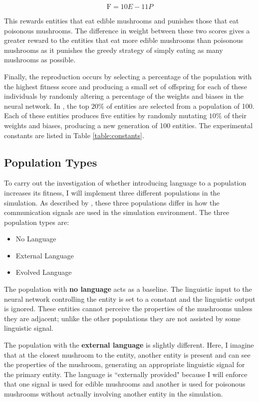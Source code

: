 \documentclass[12pt,a4paper,twoside,openright]{report}
\begin{document}
\begin{equation}
\label{equation:fitness}
\mathrm{F} = 10 E- 11 P
\end{equation}

This rewards entities that eat edible mushrooms and punishes those that eat poisonous mushrooms. The difference in weight between these two scores gives a greater reward to the entities that eat more edible mushrooms than poisonous mushrooms as it punishes the greedy strategy of simply eating as many mushrooms as possible.

Finally, the reproduction occurs by selecting a percentage of the population with the highest fitness score and producing a small set of offspring for each of these individuals by randomly altering a percentage of the weights and biases in the neural network. In \cite{Cangelosi1998}, the top $20\%$ of entities are selected from a population of 100. Each of these entities produces five entities by randomly mutating $10\%$ of their weights and biases, producing a new generation of 100 entities. The experimental constants are listed in Table \ref{table:constants}.

\subsection{Population Types}\label{section:populations}

To carry out the investigation of whether introducing language to a population increases its fitness, I will implement three different populations in the simulation. As described by \cite{Cangelosi1998}, these three populations differ in how the communication signals are used in the simulation environment. The three population types are:

\begin{itemize}
	\item No Language
	\item External Language
	\item Evolved Language
\end{itemize}

The population with {\bf no language} acts as a baseline. The linguistic input to the neural network controlling the entity is set to a constant and the linguistic output is ignored. These entities cannot perceive the properties of the mushrooms unless they are adjacent; unlike the other populations they are not assisted by some linguistic signal.

The population with the {\bf external language} is slightly different. Here, I imagine that at the closest mushroom to the entity, another entity is present and can see the properties of the mushroom, generating an appropriate linguistic signal for the primary entity. The language is ``externally provided" because I will enforce that one signal is used for edible mushrooms and another is used for poisonous mushrooms without actually involving another entity in the simulation. 
\end{document}
